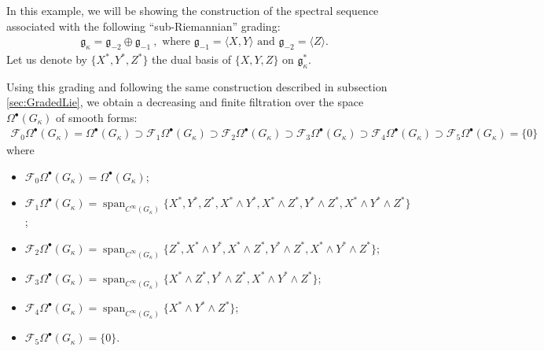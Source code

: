 \documentclass[10pt]{amsart}
\theoremstyle{remark}
\DeclareMathOperator{\spn}{span}
\numberwithin{equation}{section}
\begin{document}
In this example, we will be showing the construction of the spectral sequence associated with the following ``sub-Riemannian'' grading:
\begin{align*}
    \mathfrak{g}_\kappa=\mathfrak{g}_{-2}\oplus\mathfrak{g}_{-1}\ , \text{ where } \mathfrak{g}_{-1}=\langle X,Y\rangle\text{ and }\mathfrak{g}_{-2}=\langle Z\rangle.
\end{align*}
Let us denote by $\lbrace X^\ast,Y^\ast,Z^\ast\rbrace$ the dual basis of $\lbrace X,Y,Z\rbrace$ on $\mathfrak{g}_\kappa^\ast$.

Using this grading and following the same construction described in subsection \ref{sec:GradedLie}, we obtain a decreasing and finite filtration over the space $\Omega^\bullet(G_\kappa)$ of smooth forms:
\begin{align*}
    \mathcal{F}_0\Omega^\bullet(G_\kappa)=\Omega^\bullet(G_\kappa)\supset\mathcal{F}_1\Omega^\bullet(G_\kappa)\supset\mathcal{F}_2\Omega^\bullet(G_\kappa)\supset\mathcal{F}_3\Omega^\bullet(G_\kappa)\supset\mathcal{F}_4\Omega^\bullet(G_\kappa)\supset\mathcal{F}_5\Omega^\bullet(G_\kappa)=\lbrace 0\rbrace
\end{align*}
where
\begin{itemize}
    \item $\mathcal{F}_0\Omega^\bullet(G_\kappa)=\Omega^\bullet(G_\kappa)$;
    \item $\mathcal{F}_1\Omega^\bullet(G_\kappa)= \spn_{C^\infty(G_\kappa)}\lbrace X^\ast,Y^\ast,Z^\ast,X^\ast\wedge Y^\ast, X^\ast\wedge Z^\ast, Y^\ast\wedge Z^\ast, X^\ast\wedge Y^\ast\wedge Z^\ast\rbrace$;
    \item $\mathcal{F}_2\Omega^\bullet(G_\kappa)= \spn_{C^\infty(G_\kappa)}\lbrace Z^\ast,X^\ast\wedge Y^\ast, X^\ast\wedge Z^\ast, Y^\ast\wedge Z^\ast, X^\ast\wedge Y^\ast\wedge Z^\ast\rbrace$;
    \item $\mathcal{F}_3\Omega^\bullet(G_\kappa)= \spn_{C^\infty(G_\kappa)}\lbrace  X^\ast\wedge Z^\ast, Y^\ast\wedge Z^\ast, X^\ast\wedge Y^\ast\wedge Z^\ast\rbrace$;
    \item $\mathcal{F}_4\Omega^\bullet(G_\kappa)= \spn_{C^\infty(G_\kappa)}\lbrace  X^\ast\wedge Y^\ast\wedge Z^\ast\rbrace$;
    \item $\mathcal{F}_5\Omega^\bullet(G_\kappa)=\lbrace 0\rbrace$.
\end{itemize}
\end{document}
